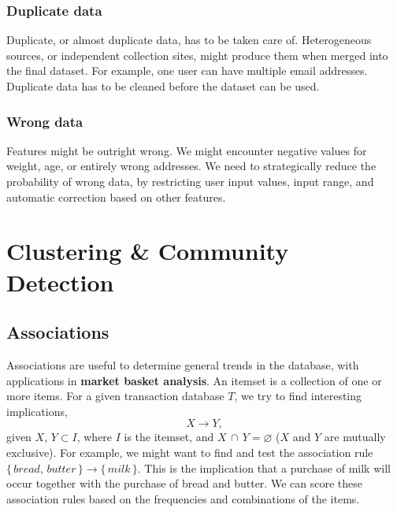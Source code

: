 \documentclass[9pt,twocolumn]{article}
\begin{document}
	\subsubsection*{Duplicate data}
		Duplicate, or almost duplicate data, has to be taken care of. Heterogeneous sources, or independent collection sites, might produce them when merged into the final dataset. For example, one user can have multiple email addresses. Duplicate data has to be cleaned before the dataset can be used.
	\subsubsection*{Wrong data}
		Features might be outright wrong. We might encounter negative values for weight, age, or entirely wrong addresses. We need to strategically reduce the probability of wrong data, by restricting user input values, input range, and automatic correction based on other features.

\section{Clustering \& Community Detection}
\subsection*{Associations}
Associations are useful to determine general trends in the database, with applications in \textbf{market basket analysis}. An itemset is a collection of one or more items. For a given transaction database $T$, we try to find interesting implications,
\begin{equation}
	X\rightarrow Y,
\end{equation}
given $X,\,Y \subset I$, where $I$ is the itemset, and $X\,\cap\,Y = \varnothing$ ($X$ and $Y$ are mutually exclusive). For example, we might want to find and test the association rule $\{\,bread,\,butter\,\} \rightarrow \{\,milk\,\}$. This is the implication that a purchase of milk will occur together with the purchase of bread and butter. We can score these association rules based on the frequencies and combinations of the items.\\
\end{document}
